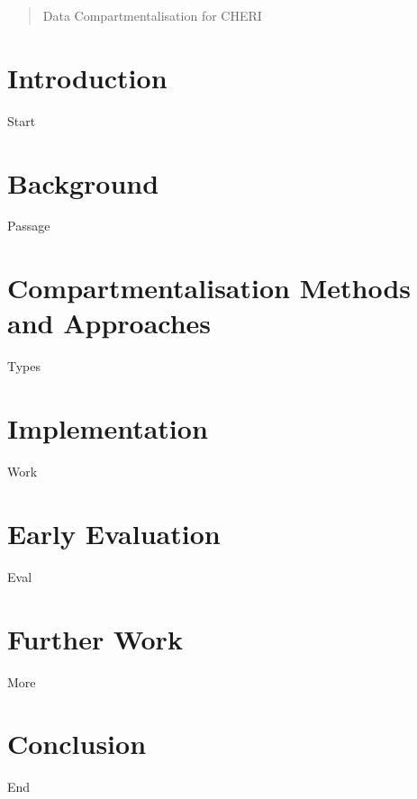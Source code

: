 \endofdump



\begin{abstract}
\noindent
Data Compartmentalisation for CHERI
\end{abstract}

\maketitle

\section{Introduction}
Start

\section{Background}
Passage

\section{Compartmentalisation Methods and Approaches}
Types

\section{Implementation}
Work

\section{Early Evaluation}
Eval

\section{Further Work}
More

\section{Conclusion}
End\cite{sison95simultaneous}






